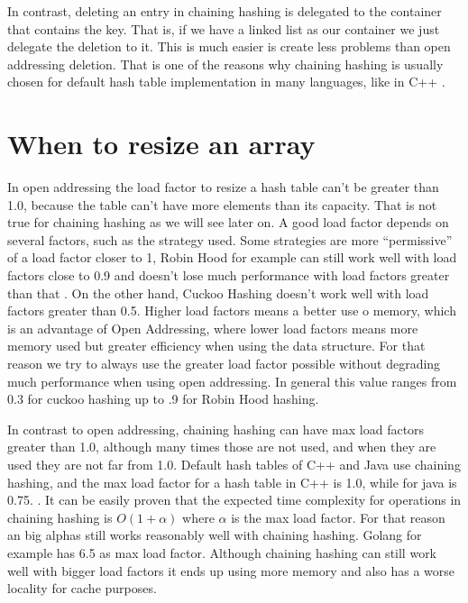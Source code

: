 In contrast, deleting an entry in chaining hashing is delegated to the container that contains the key. That is, if we have a linked list as our container we just delegate the deletion to it. This is much easier is create less problems than open addressing deletion. That is one of the reasons why chaining hashing is usually chosen for default hash table implementation in many languages, like in C++ \citep{UnorderedMapDiscussion}.

\section{When to resize an array}

In open addressing the load factor to resize a hash table can't be greater than 1.0, because the table can't have more elements than its capacity. That is not true for chaining hashing as we will see later on. A good load factor depends on several factors, such as the strategy used. Some strategies are more ``permissive'' of a load factor closer to 1, Robin Hood for example can still work well with load factors close to 0.9 and doesn't lose much performance with load factors greater than that \citep{RobinHoodDefault}. On the other hand, Cuckoo Hashing doesn't work well with load factors greater than 0.5. Higher load factors means a better use o memory, which is an advantage of Open Addressing, where lower load factors means more memory used but greater efficiency when using the data structure. For that reason we try to always use the greater load factor possible without degrading much performance when using open addressing. In general this value ranges from 0.3 for cuckoo hashing up to .9 for Robin Hood hashing.

In contrast to open addressing, chaining hashing can have max load factors greater than 1.0, although many times those are not used, and when they are used they are not far from 1.0. Default hash tables of C++ and Java use chaining hashing, and the max load factor for a hash table in C++ is 1.0, while for java is 0.75. \citep{MaxLoadFactorCplusplus}.
It can be easily proven that the expected time complexity for operations in chaining hashing is \( O(1 + \alpha) \) where \( \alpha \) is the max load factor. For that reason an big alphas still works reasonably well with chaining hashing. Golang for example has 6.5 as max load factor.
Although chaining hashing can still work well with bigger load factors it ends up using more memory and also has a worse locality for cache purposes.

